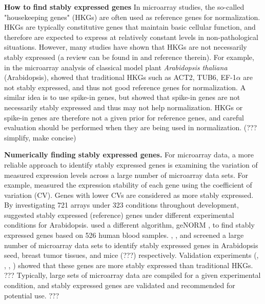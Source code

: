 \documentclass[11pt, a4paper]{article}
\begin{document}
\textbf{How to find stably expressed genes}
In microarray studies, the so-called "housekeeping genes" (HKGs) are often
used as reference genes for normalization. HKGs are typically constitutive
genes that maintain basic cellular function, and therefore are expected to
express at relatively constant levels in non-pathological situations.
However, many studies have shown that HKGs are not necessarily stably
expressed (a review can be found in \cite{huggett2005real} and reference therein). 
For example, in the microarray analysis of classical model plant
\textit{Arabidopsis thaliana} (Arabidopsis), \cite{czechowski2005genome}
showed that traditional HKGs such as ACT2, TUB6, EF-1$\alpha$ are not
stably expressed, and thus not good reference genes for normalization.  A
similar idea is to use spike-in genes, but \cite{risso2014nat} showed that
spike-in genes are not necessarily stably expressed and thus may not help
normalization. HKGs or spike-in genes are therefore not a given prior for
reference genes, and careful evaluation should be performed when they are
being used in normalization. (??? simplify, make concise)


\textbf{Numerically finding stably expressed genes.}
For microarray data, a more reliable approach to identify stably expressed
genes is examining the variation of measured expression levels across a large
number of microarray data sets. For example,  
\cite{czechowski2005genome} measured the expression stability of each gene
using the coefficient of variation (CV). Genes with lower CVs are considered
as more stably expressed. By investigating 721 arrays under 323 conditions
throughout development, \cite{czechowski2005genome} suggested stably expressed
(reference) genes under different experimental conditions for Arabidopsis.
\cite{stamova2009identification} used a different algorithm, geNORM
\citep{vandesompele2002accurate}, to find stably expressed genes based on 526
human blood samples. 
 \citet{dekkers2012identification}, 
 \citet{gur2009identification}, 
 and 
 \citet{frericks2008toolbox} 
 screened a large number of microarray data sets to identify stably
 expressed genes in Arabidopsis seed, breast tumor tissues, and mice (???)
respectively.
Validation experiments (\cite{czechowski2005genome},
\cite{dekkers2012identification}, \cite{huggett2005real},
\cite{stamova2009identification}) showed that these genes are more stably
expressed than traditional HKGs.  ??? Typically, large sets of microarray data
are compiled for a given experimental condition, and stably expressed genes
are validated and recommended for potential use. ???
\end{document}
